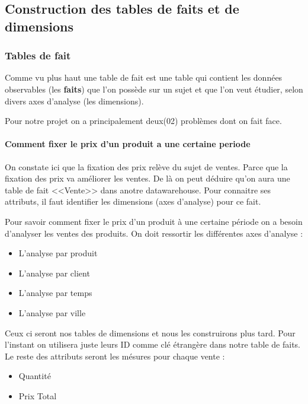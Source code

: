 \subsection{Construction des tables de faits et de dimensions}
\subsubsection{Tables de fait}
Comme vu plus haut une table de fait est une table qui contient les données observables (les \textbf{faits}) que l'on possède sur un sujet et que l'on veut étudier, selon divers axes d'analyse (les dimensions).

Pour notre projet on a principalement deux(02) problèmes dont on fait face.
\paragraph{Comment fixer le prix d'un produit a une certaine periode}
On constate ici que la fixation des prix relève du sujet de ventes. Parce que la fixation des prix va améliorer les ventes. De là on peut déduire qu'on aura une table de fait <<Vente>> dans anotre datawarehouse. Pour connaitre ses attributs, il faut identifier les dimensions (axes d'analyse) pour ce fait.

Pour savoir comment fixer le prix d'un produit à une certaine période on a besoin d'analyser les ventes des produits. On doit ressortir les différentes axes d'analyse :
\begin{itemize}
    \item L'analyse par produit
    \item L'analyse par client
    \item L'analyse par temps
    \item L'analyse par ville
\end{itemize}
Ceux ci seront nos tables de dimensions et nous les construirons plus tard. Pour l'instant on utilisera juste leurs ID comme clé étrangère dans notre table de faits. Le reste des attributs seront les mésures pour chaque vente :
\begin{itemize}
    \item Quantité
    \item Prix Total
\end{itemize}

